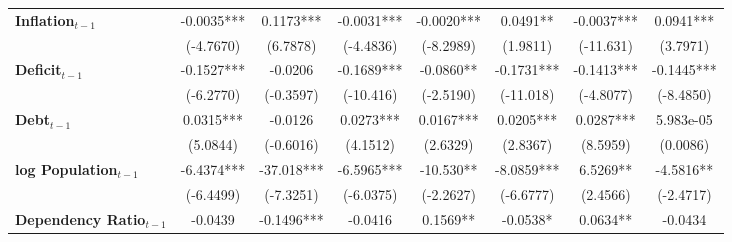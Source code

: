 \begin{center}
\begin{tabular}{lccccccc}
\textbf{Inflation$_{t-1}$}      &      -0.0035***      &          0.1173***          &          -0.0031***          &              -0.0020***             &             0.0491**             &          -0.0037***         &           0.0941***            \\
\textbf{ }                         &      (-4.7670)       &           (6.7878)          &          (-4.4836)           &              (-8.2989)              &             (1.9811)             &          (-11.631)          &            (3.7971)            \\
\textbf{Deficit$_{t-1}$}             &      -0.1527***      &           -0.0206           &          -0.1689***          &              -0.0860**              &            -0.1731***            &          -0.1413***         &           -0.1445***           \\
\textbf{ }                         &      (-6.2770)       &          (-0.3597)          &          (-10.416)           &              (-2.5190)              &            (-11.018)             &          (-4.8077)          &           (-8.4850)            \\
\textbf{Debt$_{t-1}$}                &      0.0315***       &           -0.0126           &          0.0273***           &              0.0167***              &            0.0205***             &          0.0287***          &           5.983e-05            \\
\textbf{ }                         &       (5.0844)       &          (-0.6016)          &           (4.1512)           &               (2.6329)              &             (2.8367)             &           (8.5959)          &            (0.0086)            \\
\textbf{log Population$_{t-1}$}      &      -6.4374***      &          -37.018***         &          -6.5965***          &              -10.530**              &            -8.0859***            &           6.5269**          &           -4.5816**            \\
\textbf{ }                         &      (-6.4499)       &          (-7.3251)          &          (-6.0375)           &              (-2.2627)              &            (-6.6777)             &           (2.4566)          &           (-2.4717)            \\
\textbf{Dependency Ratio$_{t-1}$}   &       -0.0439        &          -0.1496***         &           -0.0416            &               0.1569**              &             -0.0538*             &           0.0634**          &            -0.0434             \\

\end{tabular}
\end{center}
